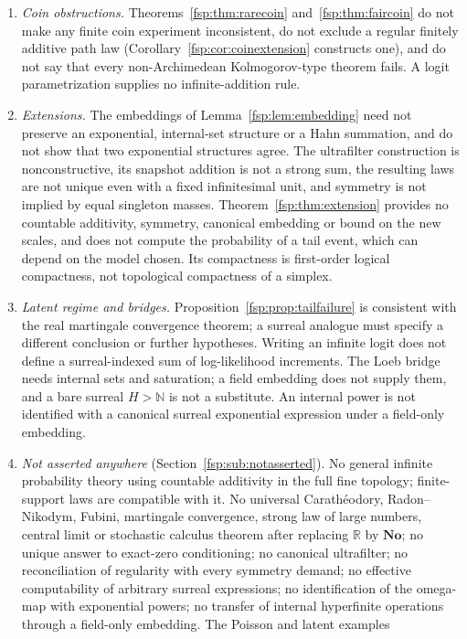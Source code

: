 \documentclass[11pt,a4paper]{article}
\numberwithin{equation}{section}
\theoremstyle{definition}
\theoremstyle{remark}
\newcommand{\R}{\mathbb R}
\newcommand{\N}{\mathbb N}
\newcommand{\No}{\mathbf{No}}
\begin{document}
\begin{enumerate}[label=(N\arabic*),leftmargin=3.2em]
probability.
\item \emph{Coin obstructions.} Theorems~\ref{fsp:thm:rarecoin}
and~\ref{fsp:thm:faircoin} do not make any finite coin experiment inconsistent,
do not exclude a regular finitely additive path law
(Corollary~\ref{fsp:cor:coinextension} constructs one), and do not say that every
non-Archimedean Kolmogorov-type theorem fails. A logit parametrization supplies
no infinite-addition rule.
\item \emph{Extensions.} The embeddings of Lemma~\ref{fsp:lem:embedding} need
not preserve an exponential, internal-set structure or a Hahn summation, and do
not show that two exponential structures agree. The ultrafilter construction is
nonconstructive, its snapshot addition is not a strong sum, the resulting laws
are not unique even with a fixed infinitesimal unit, and symmetry is not implied
by equal singleton masses. Theorem~\ref{fsp:thm:extension} provides no countable
additivity, symmetry, canonical embedding or bound on the new scales, and does
not compute the probability of a tail event, which can depend on the model
chosen. Its compactness is first-order logical compactness, not topological
compactness of a simplex.
\item \emph{Latent regime and bridges.} Proposition~\ref{fsp:prop:tailfailure}
is consistent with the real martingale convergence theorem; a surreal analogue
must specify a different conclusion or further hypotheses. Writing an infinite
logit does not define a surreal-indexed sum of log-likelihood increments. The
Loeb bridge needs internal sets and saturation; a field embedding does not
supply them, and a bare surreal $H>\N$ is not a substitute. An internal power
is not identified with a canonical surreal exponential expression under a
field-only embedding.
\item \emph{Not asserted anywhere} (Section~\ref{fsp:sub:notasserted}). No general
infinite probability theory using countable additivity in the full fine
topology; finite-support laws are compatible with it. No universal
Carath\'eodory, Radon--Nikodym, Fubini, martingale convergence, strong law of
large numbers, central limit or stochastic calculus theorem after replacing
$\R$ by $\No$; no unique answer to exact-zero conditioning; no canonical
ultrafilter; no reconciliation of regularity with every symmetry demand; no
effective computability of arbitrary surreal expressions; no identification of
the omega-map with exponential powers; no transfer of internal hyperfinite
operations through a field-only embedding. The Poisson and latent examples

\end{enumerate}
\end{document}
